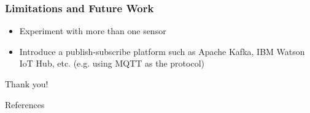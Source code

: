 \documentclass[xelatex,usenames,dvipsnames]{beamer}
\begin{document}
  \begin{frame}
    \frametitle{Limitations and Future Work}
    \begin{itemize}
      \item Experiment with more than one sensor
      \item Introduce a publish-subscribe platform such as Apache Kafka, IBM Watson IoT Hub, etc. (e.g. using MQTT as the protocol)
    \end{itemize}
    
  
  \end{frame}






  
  \begin{frame}[standout]
    Thank you!
  \end{frame}
  
  
  \begin{frame}[allowframebreaks]{References}

    
    
  
  \end{frame}



\end{document}
